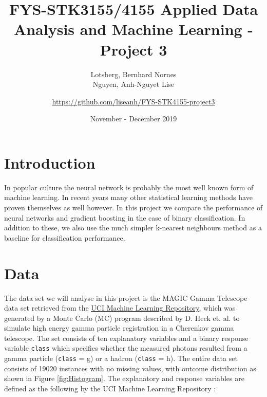 \documentclass[a4paper, 11pt, twocolumn]{article}
\title{FYS-STK3155/4155 Applied Data Analysis and Machine Learning - Project 3 }
\author{Lotsberg, Bernhard Nornes \\ Nguyen, Anh-Nguyet Lise \and
\url{https://github.com/liseanh/FYS-STK4155-project3}}
\date{November - December 2019}
\begin{document}


\section{Introduction}
In popular culture the neural network is probably the most well known form of
machine learning. In recent years many other statistical learning methods have
proven themselves as well however. In this project we compare the performance of
neural networks and gradient boosting in the case of binary classification.
In addition to these, we also use the much simpler k-nearest neighbours method
as a baseline for classification performance.



\section{Data}

The data set we will analyse in this project is the MAGIC Gamma Telescope data
set retrieved from the \href{https://archive.ics.uci.edu/ml/datasets/MAGIC+Gamma
+Telescope}{UCI Machine Learning Repository}, which was generated by a Monte
Carlo (MC) program described by D. Heck et. al. \cite{heck1998corsika} to
simulate high energy gamma particle registration in a Cherenkov gamma telescope.
The set consists of ten explanatory variables and a binary response variable
\texttt{class} which specifies whether the measured photons resulted from a gamma
particle (\texttt{class} = g) or a hadron (\texttt{class} = h). The entire data
set consists of 19020 instances with no missing values, with outcome distribution
as shown in Figure \ref{fig:Histogram}. The explanatory and response variables
are defined as the following by the UCI Machine Learning Repository
\cite{Dua:2019}:
\end{document}
